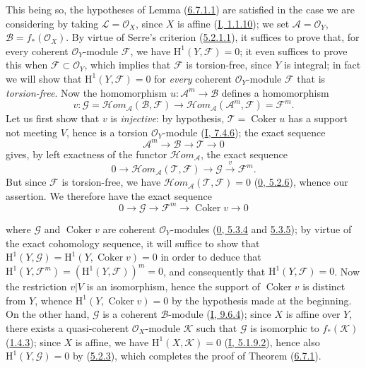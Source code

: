 This being so, the hypotheses of Lemma
(\hyperref[II.6.7.1.1]{6.7.1.1}) are satisfied in the case we are
considering by taking $\mathcal{L}=\mathcal{O}_X$, since $X$ is affine
(\hyperref[I.1.1.10]{I, 1.1.10}); we set
$\mathcal{A}=\mathcal{O}_Y$, $\mathcal{B}=f_*(\mathcal{O}_X)$. By virtue of
Serre's criterion (\hyperref[II.5.2.1.1]{5.2.1.1}), it suffices to prove
that, for every coherent $\mathcal{O}_Y$-module $\mathcal{F}$, we have
$\mathrm{H}^1(Y,\mathcal{F})=0$; it even suffices to prove this when
$\mathcal{F}\subset\mathcal{O}_Y$, which implies that $\mathcal{F}$ is
torsion-free, since $Y$ is integral; in fact we will show that
$\mathrm{H}^1(Y,\mathcal{F})=0$ for \emph{every} coherent
$\mathcal{O}_Y$-module $\mathcal{F}$ that is \emph{torsion-free}. Now the
homomorphism $u:\mathcal{A}^m\to\mathcal{B}$ defines a homomorphism
\[
v:\mathcal{G}
=\mathcal{H}om_{\mathcal{A}}(\mathcal{B},\mathcal{F})
\longrightarrow
\mathcal{H}om_{\mathcal{A}}(\mathcal{A}^m,\mathcal{F})
=\mathcal{F}^m.
\]
Let us first show that $v$ is \emph{injective}: by hypothesis,
$\mathcal{T}=\operatorname{Coker}u$ has a support not meeting $V$, hence
is a torsion $\mathcal{O}_Y$-module
(\hyperref[I.7.4.6]{I, 7.4.6}); the exact sequence
\[
\mathcal{A}^m\longrightarrow\mathcal{B}\longrightarrow\mathcal{T}
\longrightarrow0
\]
gives, by left exactness of the functor
$\mathcal{H}om_{\mathcal{A}}$, the exact sequence
\[
0\longrightarrow
\mathcal{H}om_{\mathcal{A}}(\mathcal{T},\mathcal{F})
\longrightarrow\mathcal{G}\xrightarrow{v}\mathcal{F}^m.
\]
But since $\mathcal{F}$ is torsion-free, we have
$\mathcal{H}om_{\mathcal{A}}(\mathcal{T},\mathcal{F})=0$
(\hyperref[0.5.2.6]{0, 5.2.6}), whence our assertion. We therefore have
the exact sequence
\[
0\longrightarrow\mathcal{G}\longrightarrow\mathcal{F}^m
\longrightarrow\operatorname{Coker}v\longrightarrow0
\]


where $\mathcal{G}$ and $\operatorname{Coker}v$ are coherent
$\mathcal{O}_Y$-modules
(\hyperref[0.5.3.4]{0, 5.3.4} and
\hyperref[0.5.3.5]{5.3.5}); by virtue of the exact cohomology sequence,
it will suffice to show that
$\mathrm{H}^1(Y,\mathcal{G})
=\mathrm{H}^1(Y,\operatorname{Coker}v)=0$ in order to deduce that
$\mathrm{H}^1(Y,\mathcal{F}^m)
=(\mathrm{H}^1(Y,\mathcal{F}))^m=0$, and consequently that
$\mathrm{H}^1(Y,\mathcal{F})=0$. Now the restriction $v|V$ is an isomorphism,
hence the support of $\operatorname{Coker}v$ is distinct from $Y$, whence
$\mathrm{H}^1(Y,\operatorname{Coker}v)=0$ by the hypothesis made at the
beginning. On the other hand, $\mathcal{G}$ is a coherent $\mathcal{B}$-module
(\hyperref[I.9.6.4]{I, 9.6.4}); since $X$ is affine over $Y$, there
exists a quasi-coherent $\mathcal{O}_X$-module $\mathcal{K}$ such that
$\mathcal{G}$ is isomorphic to $f_*(\mathcal{K})$
(\hyperref[II.1.4.3]{1.4.3}); since $X$ is affine, we have
$\mathrm{H}^1(X,\mathcal{K})=0$
(\hyperref[I.5.1.9.2]{I, 5.1.9.2}), hence also
$\mathrm{H}^1(Y,\mathcal{G})=0$ by
(\hyperref[II.5.2.3]{5.2.3}), which completes the proof of Theorem
(\hyperref[II.6.7.1]{6.7.1}).

